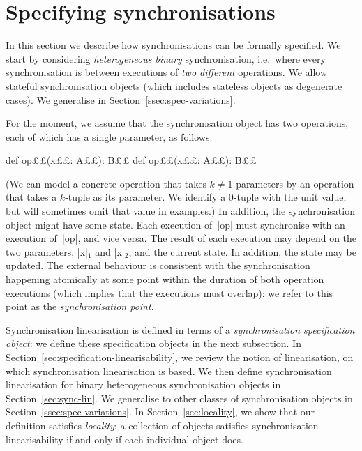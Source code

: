 \section{Specifying synchronisations}
\label{sec:spec}

In this section we describe how synchronisations can be formally specified.
We start by considering \emph{heterogeneous binary} synchronisation,
i.e.~where every synchronisation is between executions of \emph{two different}
operations.  We allow stateful synchronisation objects (which includes
stateless objects as degenerate cases).  We generalise in
Section~\ref{ssec:spec-variations}. 

For the moment, we assume that the synchronisation object has two operations,
each of which has a single parameter, as follows.
%
\begin{scala}
def op££(x££: A££): B££
def op££(x££: A££): B££
\end{scala}
%
(We can model a concrete operation that takes $k \ne 1$ parameters by an
operation that takes a $k$-tuple as its parameter.  We identify a 0-tuple with
the unit value, but will sometimes omit that value in examples.)
%
In addition, the synchronisation object might have some state.
Each execution of~|op| must synchronise with an execution of~|op|, and
vice versa.  The result of each execution may depend on the two parameters,
|x|$_1$ and |x|$_2$, and the current state.  In addition, the state may be
updated.  The external behaviour is consistent with the synchronisation
happening atomically at some point within the duration of both operation
executions (which implies that the executions must overlap): we refer to this
point as the \emph{synchronisation point}.

Synchronisation linearisation is defined in terms of a \emph{synchronisation
  specification object}: we define these specification objects in the next
subsection.  In Section~\ref{sec:specification-linearisability}, we review the
notion of linearisation, on which synchronisation linearisation is based.  We
then define synchronisation linearisation for binary heterogeneous
synchronisation objects in Section~\ref{sec:sync-lin}.  We generalise to other
classes of synchronisation objects in Section~\ref{ssec:spec-variations}.  In
Section~\ref{sec:locality}, we show that our definition satisfies
\emph{locality}: a collection of objects satisfies synchronisation
linearisability if and only if each individual object does.   

